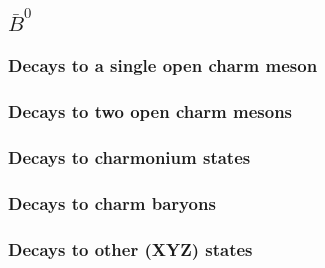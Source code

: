 


\subsection{$\bar{B}^0$}

\subsubsection{Decays to a single open charm meson}

\subsubsection{Decays to two open charm mesons}

\subsubsection{Decays to charmonium states}

\subsubsection{Decays to charm baryons}

\subsubsection{Decays to other (XYZ) states}


